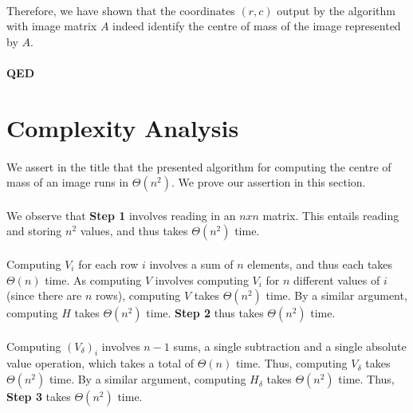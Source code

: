 \documentclass[]{article}
\begin{document}
		\paragraph{}
		Therefore, we have shown that the coordinates $(r,c)$ output by the algorithm with image matrix $A$ indeed identify the centre of mass of the image represented by $A$.
		
		\paragraph{QED}
	
	\section{Complexity Analysis}
		\paragraph{}
		We assert in the title that the presented algorithm for computing the centre of mass of an image runs in $\Theta(n^2)$. We prove our assertion in this section.
		
		\paragraph{}
		We observe that \textbf{Step 1} involves reading in an $n x n$ matrix. This entails reading and storing $n^2$ values, and thus takes $\Theta(n^2)$ time.
		
		\paragraph{}
		Computing $V_i$ for each row $i$ involves a sum of $n$ elements, and thus each takes $\Theta(n)$ time. As computing $V$ involves computing $V_i$ for $n$ different values of $i$ (since there are $n$ rows), computing $V$ takes $\Theta(n^2)$ time. By a similar argument, computing $H$ takes $\Theta(n^2)$ time. \textbf{Step 2} thus takes $\Theta(n^2)$ time.
		
		\paragraph{}
		Computing $(V_\delta)_i$ involves $n - 1$ sums, a single subtraction and a single absolute value operation, which takes a total of $\Theta(n)$ time. Thus, computing $V_\delta$ takes $\Theta(n^2)$ time. By a similar argument, computing $H_\delta$ takes $\Theta(n^2)$ time. Thus, \textbf{Step 3} takes $\Theta(n^2)$ time.
		
\end{document}
